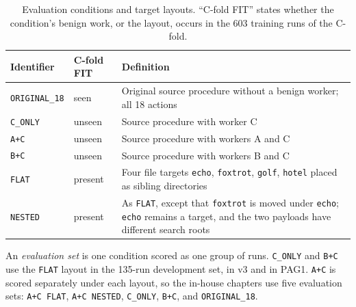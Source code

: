 \begin{table}[htbp]
\centering
\caption[Evaluation conditions and target layouts]{Evaluation conditions and target layouts. ``C-fold FIT'' states
whether the condition's benign work, or the layout, occurs in the 603
training runs of the C-fold.}
\label{tab:conditions}
\begin{tabularx}{\textwidth}{@{}llX@{}}
\toprule
Identifier & C-fold FIT & Definition \\
\midrule
\texttt{ORIGINAL\_18} & seen & Original source procedure without a benign worker; all 18 actions \\
\texttt{C\_ONLY} & unseen & Source procedure with worker C \\
\texttt{A+C} & unseen & Source procedure with workers A and C \\
\texttt{B+C} & unseen & Source procedure with workers B and C \\
\midrule
\texttt{FLAT} & present & Four file targets \texttt{echo}, \texttt{foxtrot}, \texttt{golf}, \texttt{hotel} placed as sibling directories \\
\texttt{NESTED} & present & As \texttt{FLAT}, except that \texttt{foxtrot} is moved under \texttt{echo}; \texttt{echo} remains a target, and the two payloads have different search roots \\
\bottomrule
\end{tabularx}
\end{table}

An \emph{evaluation set} is one condition scored as one group of runs.
\texttt{C\_ONLY} and \texttt{B+C} use the \texttt{FLAT} layout in the
135-run development set, in v3 and in PAG1. \texttt{A+C} is scored separately under each layout, so the in-house
chapters use five evaluation sets: \texttt{A+C FLAT},
\texttt{A+C NESTED}, \texttt{C\_ONLY}, \texttt{B+C}, and
\texttt{ORIGINAL\_18}.


